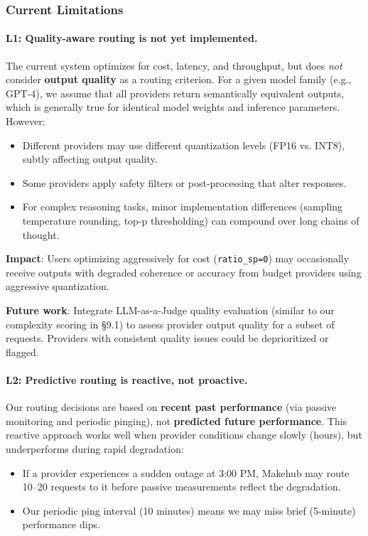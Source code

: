 \documentclass[english]{article}
\begin{document}
\subsubsection{Current Limitations}

\paragraph{L1: Quality-aware routing is not yet implemented.}

The current system optimizes for cost, latency, and throughput, but does \emph{not} consider \textbf{output quality} as a routing criterion. For a given model family (e.g., GPT-4), we assume that all providers return semantically equivalent outputs, which is generally true for identical model weights and inference parameters. However:
\begin{itemize}
    \item Different providers may use different quantization levels (FP16 vs. INT8), subtly affecting output quality.
    \item Some providers apply safety filters or post-processing that alter responses.
    \item For complex reasoning tasks, minor implementation differences (sampling temperature rounding, top-p thresholding) can compound over long chains of thought.
\end{itemize}

\textbf{Impact}: Users optimizing aggressively for cost (\texttt{ratio\_sp=0}) may occasionally receive outputs with degraded coherence or accuracy from budget providers using aggressive quantization.

\textbf{Future work}: Integrate LLM-as-a-Judge quality evaluation (similar to our complexity scoring in §9.1) to assess provider output quality for a subset of requests. Providers with consistent quality issues could be deprioritized or flagged.

\paragraph{L2: Predictive routing is reactive, not proactive.}

Our routing decisions are based on \textbf{recent past performance} (via passive monitoring and periodic pinging), not \textbf{predicted future performance}. This reactive approach works well when provider conditions change slowly (hours), but underperforms during rapid degradation:
\begin{itemize}
    \item If a provider experiences a sudden outage at 3:00 PM, Makehub may route 10--20 requests to it before passive measurements reflect the degradation.
    \item Our periodic ping interval (10 minutes) means we may miss brief (5-minute) performance dips.
\end{itemize}
\end{document}
